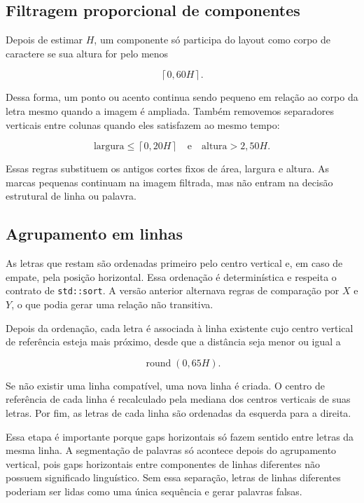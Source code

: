 \documentclass[12pt,a4paper]{article}
\begin{document}
\subsection{Filtragem proporcional de componentes}

Depois de estimar $H$, um componente só participa do layout como corpo de caractere se sua altura for pelo menos

\[
\left\lceil 0{,}60H \right\rceil.
\]

Dessa forma, um ponto ou acento continua sendo pequeno em relação ao corpo da letra mesmo quando a imagem é ampliada. Também removemos separadores verticais entre colunas quando eles satisfazem ao mesmo tempo:

\[
\text{largura} \leq \left\lceil 0{,}20H \right\rceil
\quad \text{e} \quad
\text{altura} > 2{,}50H.
\]

Essas regras substituem os antigos cortes fixos de área, largura e altura. As marcas pequenas continuam na imagem filtrada, mas não entram na decisão estrutural de linha ou palavra.

\subsection{Agrupamento em linhas}

As letras que restam são ordenadas primeiro pelo centro vertical e, em caso de empate, pela posição horizontal. Essa ordenação é determinística e respeita o contrato de \texttt{std::sort}. A versão anterior alternava regras de comparação por $X$ e $Y$, o que podia gerar uma relação não transitiva.

Depois da ordenação, cada letra é associada à linha existente cujo centro vertical de referência esteja mais próximo, desde que a distância seja menor ou igual a

\[
\operatorname{round}(0{,}65H).
\]

Se não existir uma linha compatível, uma nova linha é criada. O centro de referência de cada linha é recalculado pela mediana dos centros verticais de suas letras. Por fim, as letras de cada linha são ordenadas da esquerda para a direita.

Essa etapa é importante porque gaps horizontais só fazem sentido entre letras da mesma linha. A segmentação de palavras só acontece depois do agrupamento vertical, pois gaps horizontais entre componentes de linhas diferentes não possuem significado linguístico. Sem essa separação, letras de linhas diferentes poderiam ser lidas como uma única sequência e gerar palavras falsas.
\end{document}
